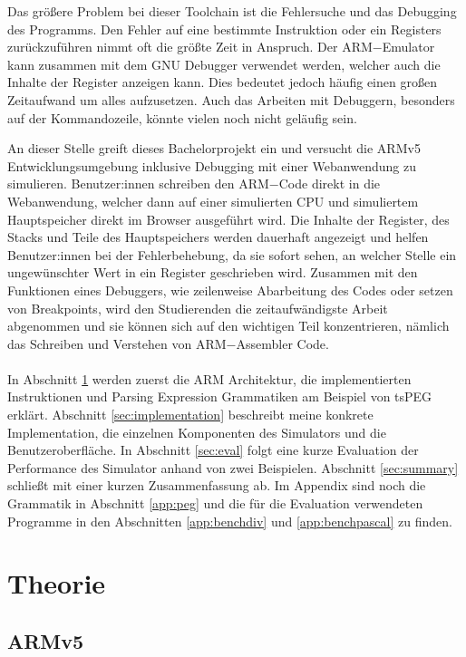 \documentclass[a4paper, 11pt, onecolumn]{article}
\begin{document}
Das größere Problem bei dieser Toolchain ist die Fehlersuche und das Debugging des Programms. Den Fehler auf eine bestimmte Instruktion oder ein Registers zurückzuführen nimmt oft die größte Zeit in Anspruch. Der ARM$-$Emulator kann zusammen mit dem GNU Debugger \cite{gdb}  verwendet werden, welcher auch die Inhalte der Register anzeigen kann. Dies bedeutet jedoch häufig einen großen Zeitaufwand um alles aufzusetzen. Auch das Arbeiten mit Debuggern, besonders auf der Kommandozeile, könnte vielen noch nicht geläufig sein. 

An dieser Stelle greift dieses Bachelorprojekt ein und versucht die ARMv5 Entwicklungsumgebung inklusive Debugging mit einer Webanwendung zu simulieren. Benutzer:innen schreiben den ARM$-$Code direkt in die Webanwendung, welcher dann auf einer simulierten CPU und simuliertem Hauptspeicher direkt im Browser ausgeführt wird. Die Inhalte der Register, des Stacks und Teile des Hauptspeichers werden dauerhaft angezeigt und helfen Benutzer:innen bei der Fehlerbehebung, da sie sofort sehen, an welcher Stelle ein ungewünschter Wert in ein Register geschrieben wird. Zusammen mit den Funktionen eines Debuggers, wie zeilenweise Abarbeitung des Codes oder setzen von Breakpoints, wird den Studierenden die zeitaufwändigste Arbeit abgenommen und sie können sich auf den wichtigen Teil konzentrieren, nämlich das Schreiben und Verstehen von ARM$-$Assembler Code.\\ \\
In Abschnitt \ref{sec:theory} werden zuerst die ARM Architektur, die implementierten Instruktionen und Parsing Expression Grammatiken am Beispiel von tsPEG \cite{tspeg} erklärt. Abschnitt \ref{sec:implementation} beschreibt meine konkrete Implementation, die einzelnen Komponenten des Simulators und die Benutzeroberfläche. In Abschnitt \ref{sec:eval} folgt eine kurze Evaluation der Performance des Simulator anhand von zwei Beispielen. Abschnitt \ref{sec:summary} schließt mit einer kurzen Zusammenfassung ab. Im Appendix sind noch die Grammatik in Abschnitt \ref{app:peg} und die für die Evaluation verwendeten Programme in den Abschnitten \ref{app:benchdiv} und \ref{app:benchpascal} zu finden.

\newpage

\section{Theorie}\label{sec:theory}

\subsection{ARMv5}\label{sec:armv5}
\end{document}
